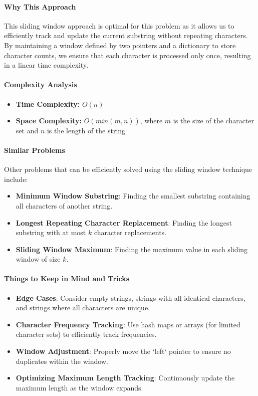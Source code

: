 \paragraph*{Why This Approach}

This sliding window approach is optimal for this problem as it allows us to efficiently track and update the current substring without repeating characters. By maintaining a window defined by two pointers and a dictionary to store character counts, we ensure that each character is processed only once, resulting in a linear time complexity.

\paragraph*{Complexity Analysis}

\begin{itemize}
    \item \textbf{Time Complexity:} \(O(n)\)
    \item \textbf{Space Complexity:} \(O(min(m, n))\), where \(m\) is the size of the character set and \(n\) is the length of the string
\end{itemize}

\paragraph*{Similar Problems}

Other problems that can be efficiently solved using the sliding window technique include:

\begin{itemize}
    \item \textbf{Minimum Window Substring}: Finding the smallest substring containing all characters of another string.
    \item \textbf{Longest Repeating Character Replacement}: Finding the longest substring with at most \(k\) character replacements.
    \item \textbf{Sliding Window Maximum}: Finding the maximum value in each sliding window of size \(k\).
\end{itemize}

\paragraph*{Things to Keep in Mind and Tricks}

\begin{itemize}
    \item \textbf{Edge Cases}: Consider empty strings, strings with all identical characters, and strings where all characters are unique.
    \item \textbf{Character Frequency Tracking}: Use hash maps or arrays (for limited character sets) to efficiently track frequencies.
    \item \textbf{Window Adjustment}: Properly move the `left` pointer to ensure no duplicates within the window.
    \item \textbf{Optimizing Maximum Length Tracking}: Continuously update the maximum length as the window expands.
\end{itemize}


